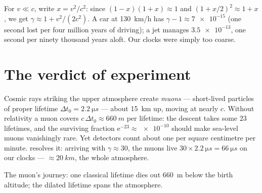\begin{remark}\label{rem:g12:special-relativity:everyday}
For $v \ll c$, write $x = v^2/c^2$: since $(1-x)(1+x) \approx 1$ and
$(1 + x/2)^2 \approx 1 + x$, we get $\gamma \approx 1 + v^2/(2c^2)$. A car
at \qty{130}{km/h} has $\gamma - 1 \approx \num{7e-15}$ (one second lost
per four million years of driving); a jet manages $\num{3.5e-13}$, one
second per ninety thousand years aloft. Our clocks were simply too coarse.
\end{remark}

\section{The verdict of experiment}

\begin{example}\label{ex:g12:special-relativity:muons}
Cosmic rays striking the upper atmosphere create \emph{muons} ---
short-lived particles of proper lifetime $\Delta t_0 = \qty{2.2}{\micro s}$
--- about \qty{15}{km} up, moving at nearly $c$. Without relativity a muon
covers $c\,\Delta t_0 \approx \qty{660}{m}$ per lifetime: the descent takes
some $23$ lifetimes, and the surviving fraction
$\mathrm{e}^{-23} \approx \num{e-10}$ should make sea-level muons
vanishingly rare. Yet detectors count about one per square centimetre per
minute.  resolves it: arriving with $\gamma \approx 30$, the
muons live $30 \times \qty{2.2}{\micro s} = \qty{66}{\micro s}$ on our
clocks ---  $\approx \qty{20}{km}$, the whole atmosphere.
\end{example}

\begin{omfigure}

{\small The muon's journey: one classical lifetime dies out \qty{660}{m}
below the birth altitude; the dilated lifetime spans the atmosphere.}
\end{omfigure}

